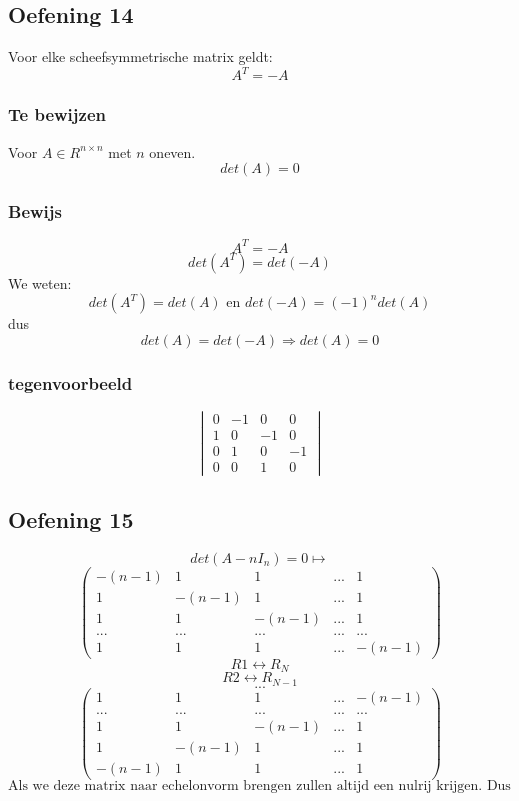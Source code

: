 \documentclass[lineaire_algebra_oplossingen.tex]{subfiles}
\begin{document}
\subsection{Oefening 14}
Voor elke scheefsymmetrische matrix geldt:
\[
A^T= -A
\]
\subsubsection*{Te bewijzen}
Voor $A\in R^{n\times n}$ met $n$ oneven.
\[
det(A) = 0
\]
\subsubsection*{Bewijs}
\[
A^T = -A
\]
\[
det(A^T) = det(-A)
\]
We weten:
\[
det(A^T) = det(A) \text{ en } det(-A) = (-1)^n det(A)
\]
dus
\[
det(A) = det(-A) \Rightarrow det(A) = 0
\]

\subsubsection*{tegenvoorbeeld}
\[
\begin{vmatrix}
0 & -1 & 0 & 0\\
1 & 0 & -1 & 0\\
0 & 1 & 0 & -1\\
0 & 0 & 1 & 0
\end{vmatrix}
\]
\subsection{Oefening 15}
\[ det(A-nI_{n})=0 \longmapsto \]
\[
\begin{pmatrix}
-(n-1) & 1 & 1 &... & 1\\
1 & -(n-1) & 1 & ... & 1\\
1 & 1 & -(n-1) & ... & 1\\
... & ... & ... & ... & ...\\
1 & 1 & 1 & ... & -(n-1)
\end{pmatrix} 
\]
\[R1 \leftrightarrow R_{N} \]
\[R2 \leftrightarrow R_{N-1} \]
\[...\]
\[
\begin{pmatrix}
1 & 1 & 1 & ... & -(n-1)\\
... & ... & ... & ... & ...\\
1 & 1 & -(n-1) & ... & 1\\
1 & -(n-1) & 1 & ... & 1\\
-(n-1) & 1 & 1 &... & 1
\end{pmatrix} 
\]
\[ \text{Als we deze matrix naar echelonvorm brengen zullen altijd een nulrij krijgen. Dus det=0}\]
\end{document}
